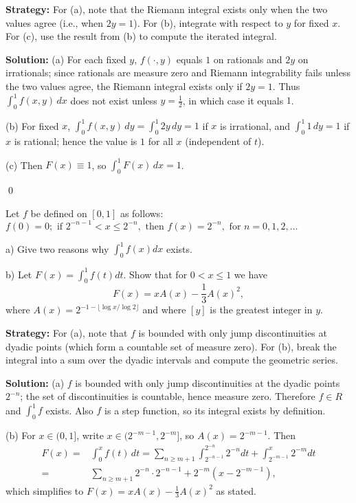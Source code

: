 \noindent\textbf{Strategy:} For (a), note that the Riemann integral exists only when the two values agree (i.e., when $2y = 1$). For (b), integrate with respect to $y$ for fixed $x$. For (c), use the result from (b) to compute the iterated integral.

\bigskip\noindent\textbf{Solution:}
(a) For each fixed $y$, $f(\cdot,y)$ equals $1$ on rationals and $2y$ on irrationals; since rationals are measure zero and Riemann integrability fails unless the two values agree, the Riemann integral exists only if $2y=1$. Thus $\int_0^1 f(x,y)\,dx$ does not exist unless $y=\tfrac12$, in which case it equals $1$.

(b) For fixed $x$, $\int_0^1 f(x,y)\,dy=\int_0^1 2y\,dy=1$ if $x$ is irrational, and $\int_0^1 1\,dy=1$ if $x$ is rational; hence the value is $1$ for all $x$ (independent of $t$).

(c) Then $F(x)\equiv 1$, so $\int_0^1 F(x)\,dx=1$.




\qed
\begin{problembox}
\begin{problemstatement}
Let $f$ be defined on $[0, 1]$ as follows: $f(0) = 0; \text{ if } 2^{-n-1} < x \leq 2^{-n}, \text{ then } f(x) = 2^{-n}, \text{ for } n = 0, 1, 2, \ldots$

a) Give two reasons why $\int_{0}^{1} f(x) dx$ exists.

b) Let $F(x) = \int_{0}^{1} f(t) dt$. Show that for $0 < x \leq 1$ we have
\[F(x) = xA(x) - \frac{1}{3} A(x)^{2},\]
where $A(x) = 2^{-1-\lfloor \log x / \log 2 \rfloor}$ and where $[y]$ is the greatest integer in $y$.
\end{problemstatement}
\end{problembox}

\noindent\textbf{Strategy:} For (a), note that $f$ is bounded with only jump discontinuities at dyadic points (which form a countable set of measure zero). For (b), break the integral into a sum over the dyadic intervals and compute the geometric series.

\bigskip\noindent\textbf{Solution:}
(a) $f$ is bounded with only jump discontinuities at the dyadic points $2^{-n}$; the set of discontinuities is countable, hence measure zero. Therefore $f\in R$ and $\int_0^1 f$ exists. Also $f$ is a step function, so its integral exists by definition.

(b) For $x\in(0,1]$, write $x\in(2^{-m-1},2^{-m}]$, so $A(x)=2^{-m-1}$. Then
\begin{align*}
F(x)=&\int_0^x f(t)\,dt=\sum_{n\ge m+1} \int_{2^{-n-1}}^{2^{-n}} 2^{-n}dt + \int_{2^{-m-1}}^{x} 2^{-m}dt \\
=&\sum_{n\ge m+1}2^{-n}\cdot 2^{-n-1}+2^{-m}(x-2^{-m-1}),
\end{align*}
which simplifies to $F(x)=xA(x)-\tfrac13 A(x)^2$ as stated.




